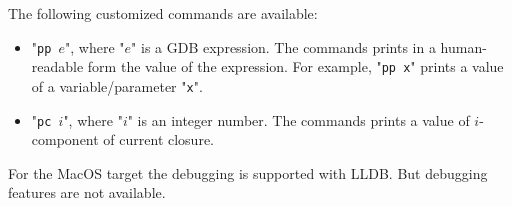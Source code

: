 The following customized commands are available:

\begin{itemize}
\item "\texttt{pp }$e$", where "$e$" is a \textsc{GDB} expression. The commands prints in a human-readable form the value of the expression. For example,
  "\texttt{pp x}" prints a value of a variable/parameter "\texttt{x}".
\item "\texttt{pc }$i$", where "$i$" is an integer number. The commands prints a value of $i$-component of current closure.
\end{itemize}

For the MacOS target the debugging is supported with \textsc{LLDB}.
But debugging features are not available.
